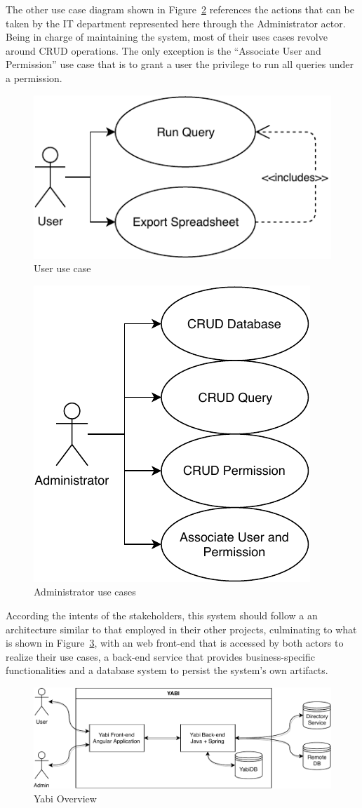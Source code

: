 The other use case diagram shown in Figure~\ref{fig:adminusecases} references the actions that can be taken by the \gls{IT} department represented here through the Administrator actor. Being in charge of maintaining the system, most of their uses cases revolve around \gls{CRUD} operations. The only exception is the ``Associate User and Permission'' use case that is to grant a user the privilege to run all queries under a permission.

\begin{figure}
  \centering
  \includegraphics[width=.5\textwidth]{images/diagramas/userusecase}
  \caption{User use case}\label{fig:userusecase}
\end{figure}

\begin{figure}
  \centering
  \includegraphics[width=.5\textwidth]{images/diagramas/adminusecase}
  \caption{Administrator use cases}\label{fig:adminusecases}
\end{figure}

According the intents of the stakeholders, this system should follow a an architecture similar to that employed in their other projects, culminating to what is shown in Figure~\ref{fig:overview}, with an web front-end that is accessed by both actors to realize their use cases, a back-end service that provides business-specific functionalities and a database system to persist the system's own artifacts.

\begin{figure}
  \centering
  \includegraphics[width=\textwidth]{images/diagramas/overview.pdf}
  \caption{Yabi Overview}\label{fig:overview}
\end{figure}



